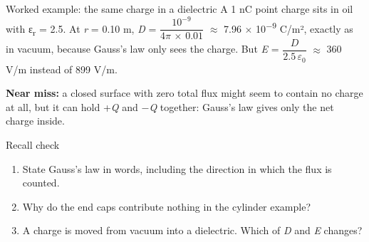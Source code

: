\documentclass[11pt]{article}
\begin{document}
\begin{keepsection}
\begin{keepsection}
\begin{workedbox}{Worked example: the same charge in a dielectric}
A 1 nC point charge sits in oil with ε\textsubscript{r} = 2.5. At \textit{r} = 0.10 m, \textit{D} = {\small\ensuremath{\dfrac{10^{-9}}{4π\, \times \, 0.01}}} \ensuremath{\approx} 7.96 \ensuremath{\times} 10\textsuperscript{\ensuremath{-}9} C/m², exactly as in vacuum, because Gauss’s law only sees the charge. But \textit{E} = {\small\ensuremath{\dfrac{{D}}{2.5\, ε_{0}}}} \ensuremath{\approx} 360 V/m instead of 899 V/m.
\end{workedbox}

\begin{notebox}\textbf{Near miss:} a closed surface with zero total flux might seem to contain no charge at all, but it can hold +\textit{Q} and \ensuremath{-}\textit{Q} together: Gauss’s law gives only the net charge inside.\end{notebox}

\begin{recallbox}{Recall check}
\begin{enumerate}
\item State Gauss’s law in words, including the direction in which the flux is counted.
\item Why do the end caps contribute nothing in the cylinder example?
\item A charge is moved from vacuum into a dielectric. Which of \textit{D} and \textit{E} changes?
\end{enumerate}

\end{recallbox}
\end{keepsection}
\end{keepsection}
\end{document}
